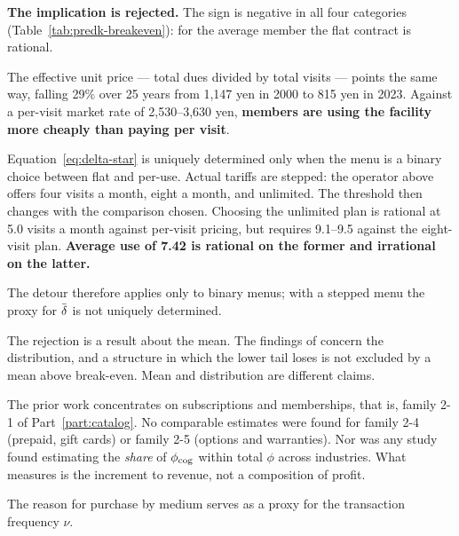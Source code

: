 \textbf{The implication is rejected.} The sign is negative in all four categories
(Table~\ref{tab:predk-breakeven}): for the average member the flat contract is rational.

The effective unit price --- total dues divided by total visits --- points the same way,
falling 29\% over 25 years from 1{,}147 yen in 2000 to 815 yen in 2023. Against a per-visit
market rate of 2{,}530--3{,}630 yen, \textbf{members are using the facility more cheaply than
paying per visit}.

\begin{remark}
\label{rem:detour-limit}
Equation~\eqref{eq:delta-star} is uniquely determined only when the menu is a binary choice
between flat and per-use. Actual tariffs are stepped: the operator above offers four visits a
month, eight a month, and unlimited. The threshold then changes with the comparison chosen.
Choosing the unlimited plan is rational at 5.0 visits a month against per-visit pricing, but
requires 9.1--9.5 against the eight-visit plan.
\textbf{Average use of 7.42 is rational on the former and irrational on the latter.}

The detour therefore applies only to binary menus; with a stepped menu the proxy for $\dbar$
is not uniquely determined.
\end{remark}

\begin{remark}[$\phi_{\rm cog}=0$ does not follow from this section]
The rejection is a result about the mean. The findings of \cite{dellavigna2006} concern the
distribution, and a structure in which the lower tail loses is not excluded by a mean above
break-even. Mean and distribution are different claims.
\end{remark}

\begin{remark}
The prior work concentrates on subscriptions and memberships, that is, family 2-1 of
Part~\ref{part:catalog}. No comparable estimates were found for family 2-4 (prepaid, gift
cards) or family 2-5 (options and warranties). Nor was any study found estimating the
\emph{share} of $\phi_{\rm cog}$ within total $\phi$ across industries. What
\cite{einav2025} measures is the increment to revenue, not a composition of profit.
\end{remark}

The reason for purchase by medium serves as a proxy for the transaction frequency $\nu$.

